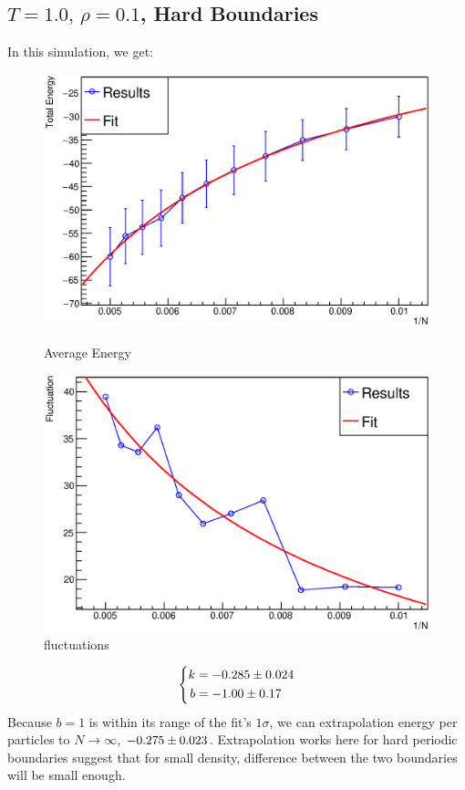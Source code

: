 \documentclass[UTF8,a4paper]{article}
\begin{document}
\subsection{$T =1.0,\, \rho = 0.1$, Hard Boundaries}
In this simulation, we get:
\begin{figure}[H]
	\centering
	\begin{minipage}[t]{0.45\textwidth}
		\centering
		\includegraphics[height=0.2\textheight]{Root Fit/fit_exp2_h.eps}
		\caption{Average Energy}
	\end{minipage}\hspace{0.5cm}
	\begin{minipage}[t]{0.45\textwidth}
		\centering
		\includegraphics[height=0.2\textheight]{Root Fit/fit_exp2_f_h.eps}
		\caption{fluctuations}
	\end{minipage}
\end{figure}

\begin{equation}
	\left\{
		\begin{aligned}
			k &= \num[separate-uncertainty = true]{-0.285+-0.024}\\
			b &= \num[separate-uncertainty = true]{-1.00+-0.17}
		\end{aligned}
	\right.
\end{equation}
Because $b=1$ is within its range of the fit's $1\sigma$, we can extrapolation energy per particles to $N\to \infty$, $\num[separate-uncertainty = true]{-0.275+-0.023}$. 
Extrapolation works here for hard periodic boundaries suggest that for small density, difference between the two boundaries will be small enough.
\end{document}
